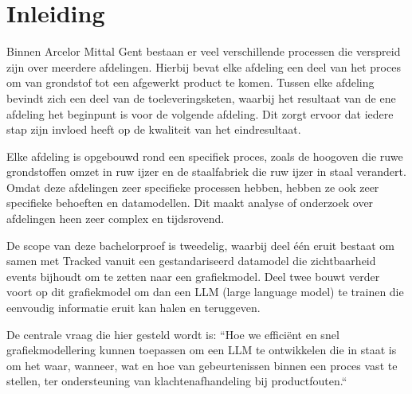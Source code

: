 


% 

\section{Inleiding}%
\label{sec:inleiding}
Binnen Arcelor Mittal Gent bestaan er veel verschillende processen die verspreid zijn over meerdere afdelingen.
Hierbij bevat elke afdeling een deel van het proces om van grondstof tot een afgewerkt product te komen. 
Tussen elke afdeling bevindt zich een deel van de toeleveringsketen, waarbij het resultaat van de ene afdeling het beginpunt is voor de volgende afdeling.
Dit zorgt ervoor dat iedere stap zijn invloed heeft op de kwaliteit van het eindresultaat.

Elke afdeling is opgebouwd rond een specifiek proces, zoals de hoogoven die ruwe grondstoffen omzet in ruw ijzer en de staalfabriek die ruw ijzer in staal verandert.
Omdat deze afdelingen zeer specifieke processen hebben, hebben ze ook zeer specifieke behoeften en datamodellen.
Dit maakt analyse of onderzoek over afdelingen heen zeer complex en tijdsrovend.

De scope van deze bachelorproef is tweedelig, waarbij deel één eruit bestaat om samen met Tracked vanuit een gestandariseerd datamodel die zichtbaarheid events bijhoudt om te zetten naar een grafiekmodel.
Deel twee bouwt verder voort op dit grafiekmodel om dan een LLM (large language model) te trainen die eenvoudig informatie eruit kan halen en teruggeven.

De centrale vraag die hier gesteld wordt is: ``Hoe we efficiënt en snel grafiekmodellering kunnen toepassen om een LLM te ontwikkelen die in staat is om het waar, wanneer, wat en hoe van gebeurtenissen binnen een proces vast te stellen, ter ondersteuning van klachtenafhandeling bij productfouten.``

